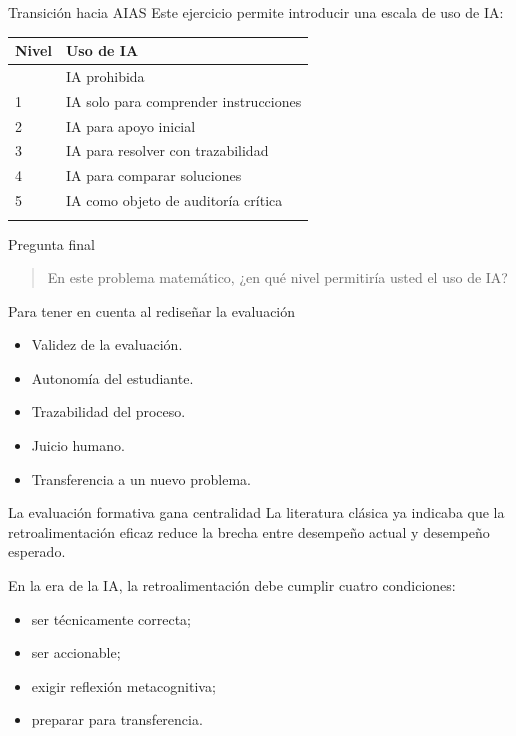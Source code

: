 \documentclass[
  ignorenonframetext,
  aspectratio=169,
  spanish,
]{beamer}
\newcounter{none} %
\providecommand{\tightlist}{%
  \setlength{\itemsep}{0pt}\setlength{\parskip}{0pt}}
\begin{document}
\begin{frame}{Transición hacia AIAS}
\protect{}\label{transiciuxf3n-hacia-aias}
Este ejercicio permite introducir una escala de uso de IA:

{\def\LTcaptype{none} %
\begin{longtable}[]{@{}ll@{}}
\toprule\noalign{}
Nivel & Uso de IA \\
\midrule\noalign{}
\endhead
0 & IA prohibida \\
1 & IA solo para comprender instrucciones \\
2 & IA para apoyo inicial \\
3 & IA para resolver con trazabilidad \\
4 & IA para comparar soluciones \\
5 & IA como objeto de auditoría crítica \\
\bottomrule\noalign{}
\end{longtable}
}
\end{frame}

\begin{frame}{Pregunta final}
\protect{}\label{pregunta-final}
\begin{quote}
En este problema matemático, ¿en qué nivel permitiría usted el uso de
IA?
\end{quote}
\end{frame}

\begin{frame}{Para tener en cuenta al rediseñar la evaluación}
\protect{}\label{para-tener-en-cuenta-al-rediseuxf1ar-la-evaluaciuxf3n}
\begin{itemize}
\tightlist
\item
  Validez de la evaluación.
\item
  Autonomía del estudiante.
\item
  Trazabilidad del proceso.
\item
  Juicio humano.
\item
  Transferencia a un nuevo problema.
\end{itemize}
\end{frame}

\begin{frame}{La evaluación formativa gana centralidad}
\protect{}\label{la-evaluaciuxf3n-formativa-gana-centralidad}
La literatura clásica ya indicaba que la retroalimentación eficaz reduce
la brecha entre desempeño actual y desempeño esperado.

En la era de la IA, la retroalimentación debe cumplir cuatro
condiciones:

\begin{itemize}
\tightlist
\item
  ser técnicamente correcta;
\item
  ser accionable;
\item
  exigir reflexión metacognitiva;
\item
  preparar para transferencia.
\end{itemize}
\end{frame}
\end{document}
